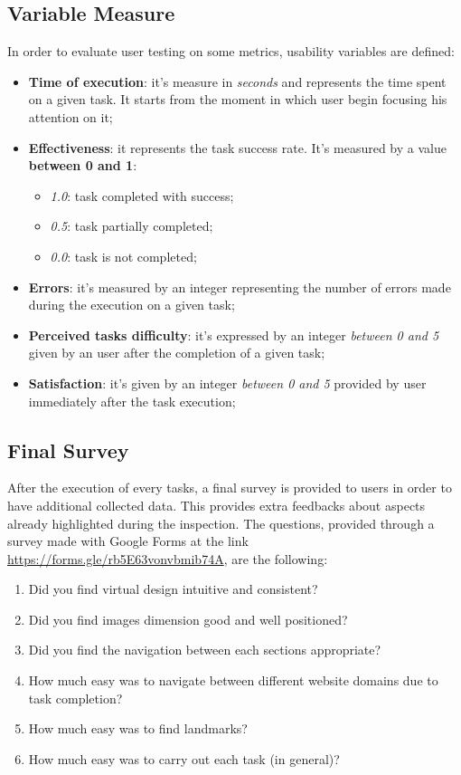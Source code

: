 \subsection{Variable Measure}
In order to evaluate user testing on some metrics, usability variables are defined:
\begin{itemize}
\item \textbf{Time of execution}: it's measure in \textit{seconds} and represents the time spent on a given task. It starts from the moment in which user begin focusing his attention on it;
\item \textbf{Effectiveness}: it represents the task success rate. It's measured by a value \textbf{between 0 and 1}:
    \begin{itemize} 
    \item \textit{1.0}: task completed with success;
    \item \textit{0.5}: task partially completed;
    \item \textit{0.0}: task is not completed;
    \end{itemize}
\item \textbf{Errors}: it's measured by an integer representing the number of errors made during the execution on a given task;
\item \textbf{Perceived tasks difficulty}: it's expressed by an integer \textit{between 0 and 5} given by an user after the completion of a given task;
\item \textbf{Satisfaction}: it's given by an integer \textit{between 0 and 5} provided by user immediately after the task execution;
\end{itemize}


\subsection{Final Survey}
After the execution of every tasks, a final survey is provided to users in order to have additional collected data. This provides extra feedbacks about aspects already highlighted during the inspection.
The questions, provided through a survey made with Google Forms at the link \url{https://forms.gle/rb5E63vonvbmib74A}, are the following:
\begin{enumerate}
\item Did you find virtual design intuitive and consistent?
\item Did you find images dimension good and well positioned?
\item Did you find the navigation between each sections appropriate?
\item How much easy was to navigate between different website domains due to task completion?
\item How much easy was to find landmarks?
\item How much easy was to carry out each task (in general)?
\end{enumerate}